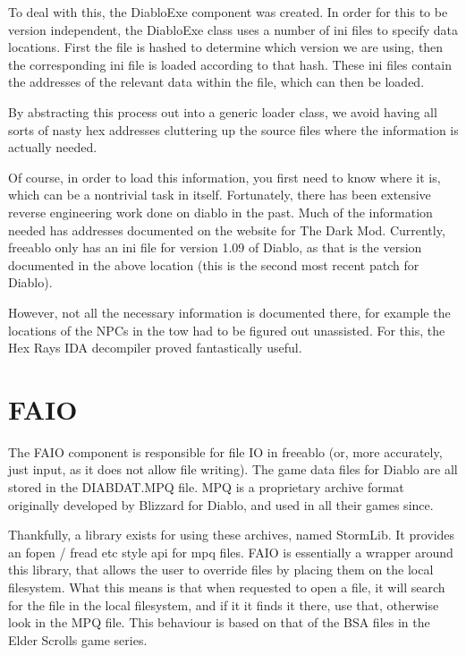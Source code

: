 	To deal with this, the DiabloExe component was created. In order for this to be version independent, the DiabloExe class uses a number of ini files to specify data locations. First the file is hashed to determine which version we are using, then the corresponding ini file is loaded according to that hash. These ini files contain the addresses of the relevant data within the file, which can then be loaded.
	
	By abstracting this process out into a generic loader class, we avoid having all sorts of nasty hex addresses cluttering up the source files where the information is actually needed.
	
	Of course, in order to load this information, you first need to know where it is, which can be a nontrivial task in itself. Fortunately, there has been extensive reverse engineering work done on diablo in the past. Much of the information needed has addresses documented on the website for The Dark Mod\cite{dmodhex}. Currently, freeablo only has an ini file for version 1.09 of Diablo, as that is the version documented in the above location (this is the second most recent patch for Diablo).
	
	However, not all the necessary information is documented there, for example the locations of the NPCs in the tow had to be figured out unassisted. For this, the Hex Rays IDA\cite{hexrays} decompiler proved fantastically useful.

\section{FAIO}
	The FAIO component is responsible for file IO in freeablo (or, more accurately, just input, as it does not allow file writing).
	The game data files for Diablo are all stored in the DIABDAT.MPQ file. MPQ is a proprietary archive format originally developed by Blizzard for Diablo, and used in all their games since.
	
	Thankfully, a library exists for using these archives, named StormLib\cite{stormlib}. It provides an fopen / fread etc style api for mpq files.
	FAIO is essentially a wrapper around this library, that allows the user to override files by placing them on the local filesystem. What this means is that when requested to open a file, it will search for the file in the local filesystem, and if it it finds it there, use that, otherwise look in the MPQ file.
	This behaviour is based on that of the BSA files in the Elder Scrolls game series.
	
